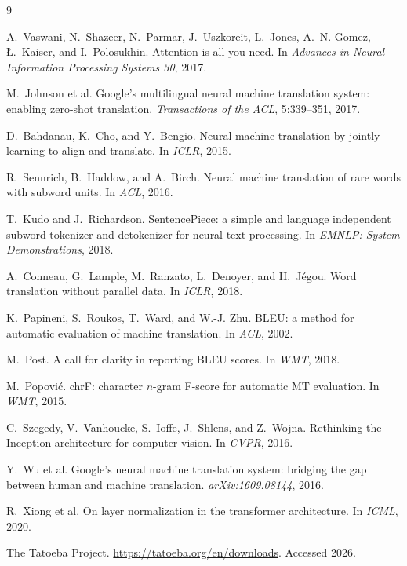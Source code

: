 \documentclass[11pt,a4paper]{article}
\begin{document}
\begin{thebibliography}{9}
\small

A.~Vaswani, N.~Shazeer, N.~Parmar, J.~Uszkoreit, L.~Jones, A.~N. Gomez,
  {\L}.~Kaiser, and I.~Polosukhin.
\newblock Attention is all you need.
\newblock In \emph{Advances in Neural Information Processing Systems 30}, 2017.

M.~Johnson et al.
\newblock Google's multilingual neural machine translation system: enabling
  zero-shot translation.
\newblock \emph{Transactions of the ACL}, 5:339--351, 2017.

D.~Bahdanau, K.~Cho, and Y.~Bengio.
\newblock Neural machine translation by jointly learning to align and
  translate.
\newblock In \emph{ICLR}, 2015.

R.~Sennrich, B.~Haddow, and A.~Birch.
\newblock Neural machine translation of rare words with subword units.
\newblock In \emph{ACL}, 2016.

T.~Kudo and J.~Richardson.
\newblock SentencePiece: a simple and language independent subword tokenizer
  and detokenizer for neural text processing.
\newblock In \emph{EMNLP: System Demonstrations}, 2018.

A.~Conneau, G.~Lample, M.~Ranzato, L.~Denoyer, and H.~J{\'e}gou.
\newblock Word translation without parallel data.
\newblock In \emph{ICLR}, 2018.

K.~Papineni, S.~Roukos, T.~Ward, and W.-J. Zhu.
\newblock BLEU: a method for automatic evaluation of machine translation.
\newblock In \emph{ACL}, 2002.

M.~Post.
\newblock A call for clarity in reporting BLEU scores.
\newblock In \emph{WMT}, 2018.

M.~Popovi{\'c}.
\newblock chrF: character $n$-gram F-score for automatic MT evaluation.
\newblock In \emph{WMT}, 2015.

C.~Szegedy, V.~Vanhoucke, S.~Ioffe, J.~Shlens, and Z.~Wojna.
\newblock Rethinking the Inception architecture for computer vision.
\newblock In \emph{CVPR}, 2016.

Y.~Wu et al.
\newblock Google's neural machine translation system: bridging the gap between
  human and machine translation.
\newblock \emph{arXiv:1609.08144}, 2016.

R.~Xiong et al.
\newblock On layer normalization in the transformer architecture.
\newblock In \emph{ICML}, 2020.

The Tatoeba Project.
\newblock \url{https://tatoeba.org/en/downloads}. Accessed 2026.

\end{thebibliography}
\end{document}
